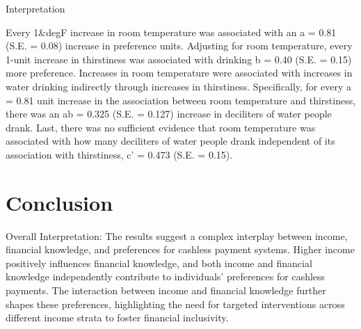 \documentclass[
  super,
  preprint,
  3p]{elsarticle}
\begin{document}
Interpretation

Every 1\&degF increase in room temperature was associated with an a =
0.81 (S.E. = 0.08) increase in preference units. Adjusting for room
temperature, every 1-unit increase in thirstiness was associated with
drinking b = 0.40 (S.E. = 0.15) more preference. Increases in room
temperature were associated with increases in water drinking indirectly
through increases in thirstiness. Specifically, for every a = 0.81 unit
increase in the association between room temperature and thirstiness,
there was an ab = 0.325 (S.E. = 0.127) increase in deciliters of water
people drank. Last, there was no sufficient evidence that room
temperature was associated with how many deciliters of water people
drank independent of its association with thirstiness, c' = 0.473 (S.E.
= 0.15).

\citep{jarvis2003}

\hypertarget{conclusion}{%
\section{Conclusion}\label{conclusion}}

Overall Interpretation: The results suggest a complex interplay between
income, financial knowledge, and preferences for cashless payment
systems. Higher income positively influences financial knowledge, and
both income and financial knowledge independently contribute to
individuals' preferences for cashless payments. The interaction between
income and financial knowledge further shapes these preferences,
highlighting the need for targeted interventions across different income
strata to foster financial inclusivity.


\renewcommand\refname{References}
  
\end{document}
